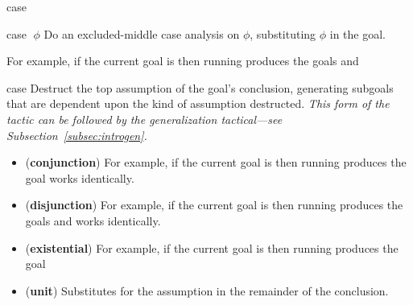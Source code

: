 \begin{tactic}{case}
  \begin{tsyntax}{case $\;\phi$}
    Do an excluded-middle case analysis on $\phi$, substituting $\phi$
    in the goal.

    For example, if the current goal is
     then
    running 
    produces the goals
    and
  \end{tsyntax}

  \begin{tsyntax}{case}
    Destruct the top assumption of the goal's conclusion, generating
    subgoals that are dependent upon the kind of assumption
    destructed. \emph{This form of the tactic can be followed by
    the generalization tactical---see Subsection~\ref{subsec:introgen}.}

    \begin{itemize}
    \item (\textbf{conjunction})
    For example, if the current goal is
     then
    running 
    produces the goal
    \ec{&&} works identically.

    \item (\textbf{disjunction})
    For example, if the current goal is
     then
    running 
    produces the goals
    and
    \ec{||} works identically.

    \item (\textbf{existential})
    For example, if the current goal is
     then
    running 
    produces the goal

    \item (\textbf{unit}) Substitutes  for the assumption in
      the remainder of the conclusion.


\end{itemize}
\end{tsyntax}
\end{tactic}
